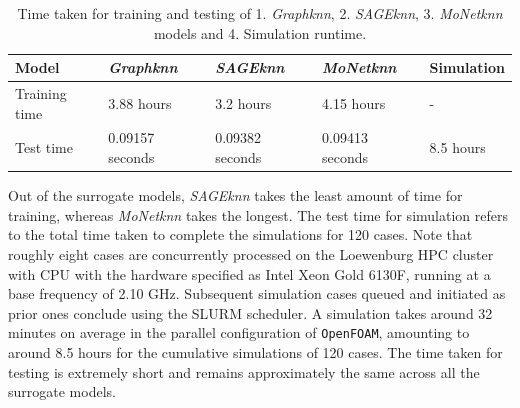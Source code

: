 \begin{table}[ht]
    \centering
    \caption{Time taken for training and testing of  1. \textit{Graphknn}, 2. \textit{SAGEknn}, 3. \textit{MoNetknn} models and 4. Simulation runtime.} 
    \label{t:times}
    \begin{tabular}{|l|l|l|l|l|}
    \hline
    \textbf{Model} & \textit{Graphknn} & \textit{SAGEknn} & \textit{MoNetknn} & Simulation\\
    \hline
    Training time & 3.88 hours & 3.2 hours & 4.15 hours & - \\
    \hline
    Test time & 0.09157 seconds  & 0.09382 seconds & 0.09413 seconds& 8.5 hours \\
    \hline
    \end{tabular}
\end{table}

Out of the surrogate models, \textit{SAGEknn} takes the least amount of time for training, whereas \textit{MoNetknn} takes the longest. The test time for simulation refers to the total time taken to complete the simulations for 120 cases. Note that roughly eight cases are concurrently processed on the Loewenburg \gls{HPC} cluster with \gls{CPU} with the hardware specified as Intel Xeon Gold 6130F, running at a base frequency of 2.10 GHz. Subsequent simulation cases queued and initiated as prior ones conclude using the \gls{SLURM} scheduler. A simulation takes around 32 minutes on average in the parallel configuration of \verb |OpenFOAM|, amounting to around 8.5 hours for the cumulative simulations of 120 cases. The time taken for testing is extremely short and remains approximately the same across all the surrogate models.

